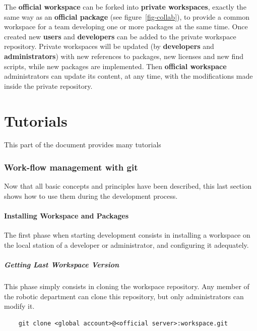 \documentclass[12pt,a4paper]{article}
\begin{document}
The \textbf{official workspace} can be forked into \textbf{private workspaces}, exactly the same way as an \textbf{official package} (see figure~\ref{fig-collab}), to provide a common workspace for a team developing one or more packages at the same time. Once created new \textbf{users} and \textbf{developers} can be added to the private workspace repository. Private workspaces will be updated (by \textbf{developers} and \textbf{administrators}) with new references to packages, new licenses and new find scripts, while new packages are implemented. Then \textbf{official workspace} administrators can update its content, at any time, with the modifications made inside the private repository.

\pagebreak

\part{Tutorials}

This part of the document provides many tutorials 

\section{Work-flow management with git}

Now that all basic concepts and principles have been described, this last section shows how to use them during the development process.

\subsection{Installing Workspace and Packages}

The first phase when starting development consists in installing a workspace on the local  station of a developer or administrator, and configuring it adequately.

\subsubsection{Getting Last Workspace Version}

This phase simply consists in cloning the workspace repository. Any member of the robotic department can clone this repository, but only administrators can  modify it.

\begin{verbatim}
	git clone <global account>@<official server>:workspace.git
\end{verbatim}
\end{document}
